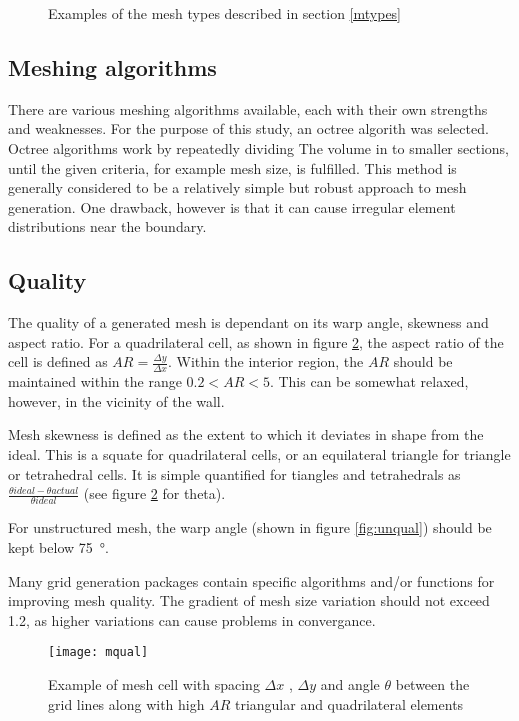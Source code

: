 \begin{figure}

  \caption{Examples of the mesh types described in section \ref{mtypes}} \label{fig:struct}
\end{figure}

\subsection{Meshing algorithms}
There are various meshing algorithms available, each with their own strengths and weaknesses. For the purpose of this study, an octree algorith was selected. Octree algorithms work by repeatedly dividing The volume in to smaller sections, until the given criteria, for example mesh size, is fulfilled. This method is generally considered to be a relatively simple but robust approach to mesh generation. One drawback, however is that it can cause irregular element distributions near the boundary.

\subsection{Quality}

The quality of a generated mesh is dependant on its warp angle, skewness and aspect ratio. For a quadrilateral cell, as shown in figure \ref{fig:mqual}, the aspect ratio of the cell is defined as $AR = \frac{\Delta y} {\Delta x}$. Within the interior region, the $AR$ should be maintained within the range $0.2 < AR < 5$. This can be somewhat relaxed, however, in the vicinity of the wall.

Mesh skewness is defined as the extent to which it deviates in shape from the ideal. This is a squate for quadrilateral cells, or an equilateral triangle for triangle or tetrahedral cells. It is simple quantified for tiangles and tetrahedrals as $\frac{\theta ideal - \theta actual} {\theta ideal}$ (see figure \ref{fig:mqual} for theta).

For unstructured mesh, the warp angle (shown in figure \ref{fig:unqual}) should be kept below \SI{75}{\degree}.

Many grid generation packages contain specific algorithms and/or functions for improving mesh quality. The gradient of mesh size variation should not exceed 1.2, as higher variations can cause problems in convergance.

\begin{figure}
  \texttt{[image: mqual]}
  \caption{Example of mesh cell with spacing $\Delta x$ , $\Delta y$ and angle $ \theta $ between the grid lines along with high $AR$ triangular and quadrilateral elements } \label{fig:mqual}
\end{figure}

